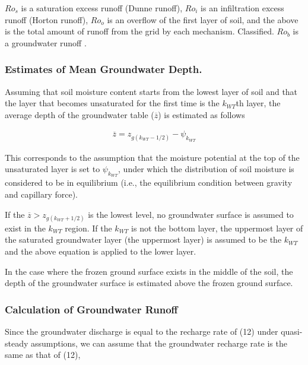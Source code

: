 \(Ro_s\) is a saturation excess runoff (Dunne runoff), \(Ro_i\) is an
infiltration excess runoff (Horton runoff), \(Ro_o\) is an overflow of
the first layer of soil, and the above is the total amount of runoff
from the grid by each mechanism. Classified. \(Ro_b\) is a groundwater
runoff .

\hypertarget{estimates-of-mean-groundwater-depth.}{%
\subsubsection{Estimates of Mean Groundwater
Depth.}\label{estimates-of-mean-groundwater-depth.}}

Assuming that soil moisture content starts from the lowest layer of soil
and that the layer that becomes unsaturated for the first time is the
\(k_{WT}\)th layer, the average depth of the groundwater table
(\(\overline{z}\)) is estimated as follows

\begin{eqnarray}
 \overline{z} = z_{g(k_{WT}-1/2)} - \psi_{k_{WT}}
\end{eqnarray}

This corresponds to the assumption that the moisture potential at the
top of the unsaturated layer is set to \(\psi_{k_{WT}}\), under which
the distribution of soil moisture is considered to be in equilibrium
(i.e., the equilibrium condition between gravity and capillary force).

If the \(\overline{z} > z_{g(k_{WT}+1/2)}\) is the lowest level, no
groundwater surface is assumed to exist in the \(k_{WT}\) region. If the
\(k_{WT}\) is not the bottom layer, the uppermost layer of the saturated
groundwater layer (the uppermost layer) is assumed to be the \(k_{WT}\)
and the above equation is applied to the lower layer.

In the case where the frozen ground surface exists in the middle of the
soil, the depth of the groundwater surface is estimated above the frozen
ground surface.

\hypertarget{calculation-of-groundwater-runoff}{%
\subsubsection{Calculation of Groundwater
Runoff}\label{calculation-of-groundwater-runoff}}

Since the groundwater discharge is equal to the recharge rate of (12)
under quasi-steady assumptions, we can assume that the groundwater
recharge rate is the same as that of (12),

